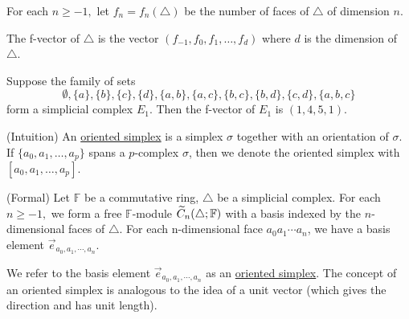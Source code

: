 \begin{defn}[f-vector]

    For each $n \geq -1,$ let $f_n = f_n(\triangle)$ be the number of faces of $\triangle$ of dimension $n$.
    
    The f-vector of $\triangle$ is the vector $(f_{-1}, f_0, f_1, \dots, f_d)$ where $d$ is the dimension of $\triangle$. 
    
    \begin{eg}
    Suppose the family of sets 
    $$\emptyset, \{a\},\{b\},\{c\}, \{d\}, \{a,b\}, \{a,c\}, \{b,c\}, \{b,d\}, \{c,d\}, \{a,b,c\}$$ form a simplicial complex $E_1$. Then the f-vector of $E_1$ is $(1,4,5,1)$.
    \end{eg}
\end{defn}

\begin{defn}

(Intuition) An \underline{oriented simplex} is a simplex $\sigma$ together with an orientation of $\sigma$. If $\{a_0, a_1, \dots, a_p\}$ spans a $p$-complex $\sigma$, then we denote the oriented simplex with $[a_0, a_1, \dots, a_p]$.

(Formal) Let $\mathbb{F}$ be a commutative ring, $\triangle$ be a simplicial complex. For each $n \geq -1,$ we form a free $\mathbb{F}$-module $\widetilde{C}_n(\triangle; \mathbb{F})$ with a basis indexed by the $n$-dimensional faces of $\triangle$. For each n-dimensional face $a_0 a_1\cdots a_n$, we have a basis element $\vec{e}_{a_0,a_1,\cdots, a_n}$. 

We refer to the basis element $\vec{e}_{a_0,a_1,\cdots, a_n}$ as an \underline{oriented simplex}. The concept of an oriented simplex is analogous to the idea of a unit vector (which gives the direction and has unit length).
\end{defn}

